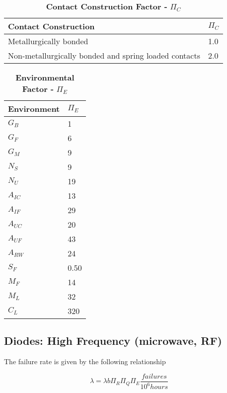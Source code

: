 \begin{table}
\caption{\textbf{Contact Construction Factor -} $\Pi_{C}$}
\label{table:<context>}
\begin{tabular}{|l|m{10cm}|} \hline
\textbf{Contact Construction} & $\Pi_{C}$ \\ \hline
Metallurgically bonded & 1.0 \\ \hline
Non-metallurgically bonded and spring loaded contacts & 2.0 \\ \hline\end{tabular}
\end{table}


\begin{table}
\caption{
\textbf{Environmental Factor -} $\Pi_{E}$}
\label{table:enviroFactorDiode}
\begin{tabular}{|l|m{10cm}|} \hline
\textbf{Environment} & $\Pi_{E}$ \\ \hline
$G_{B}$ & 1 \\ \hline
$G_{F}$ & 6 \\ \hline
$G_{M}$ & 9 \\ \hline
$N_{S}$ & 9 \\ \hline
$N_{U}$ & 19 \\ \hline
$A_{IC}$ & 13 \\ \hline
$A_{IF}$ & 29 \\ \hline
$A_{UC}$ & 20 \\ \hline
$A_{UF}$ & 43 \\ \hline
$A_{RW}$ & 24 \\ \hline
$S_{F}$ & 0.50 \\ \hline
$M_{F}$ & 14 \\ \hline
$M_{L}$ & 32 \\ \hline
$C_{L}$ & 320 \\ \hline
\end{tabular}
\end{table}



\subsection{Diodes: High Frequency (microwave, RF)}
\label{subsection:diodes-high-frequency-microwave-rf}

The failure rate is given by the following relationship

$$\lambda = \lambda{b} \Pi_{R} \Pi_{Q} \Pi_{E} \frac{failures}{10^{6} hours}$$


